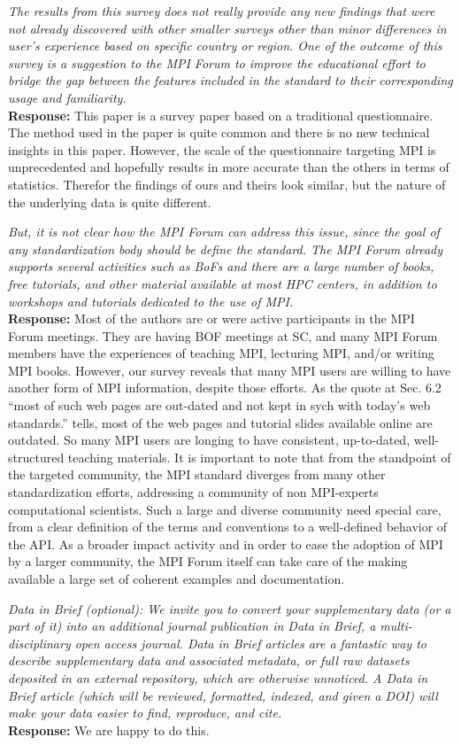 \documentclass[11pt]{article}
\newcommand{\response}[2]{{\vspace{5mm}\noindent{\bf Comment:} \em #1}\\%
  {\bf Response:} #2}
\begin{document}
\response{The results from this survey does not really provide any
  new findings that were not already discovered with other smaller
  surveys other than minor differences in user's experience based on
  specific country or region. One of the outcome of this survey is a
  suggestion to the MPI Forum to improve the educational effort to
  bridge the gap between the features included in the standard to
  their corresponding usage and familiarity.}
         {This paper is a survey paper based on a traditional
           questionnaire.  The method used in the paper is quite
           common and there is no new technical insights in this paper.
           However, the scale of the
           questionnaire targeting MPI is unprecedented and hopefully
           results in more accurate than the others in terms of
           statistics.
           Therefor the findings of ours and theirs look similar, but
           the nature of the underlying data is quite different.
}

\response{But, it is not clear how the MPI Forum can address this
  issue, since the goal of any standardization body should be define
  the standard. The MPI Forum already supports several activities such
  as BoFs and there are a large number of books, free tutorials, and
  other material available at most HPC centers, in addition to
  workshops and tutorials dedicated to the use of MPI.}
{Most of the authors are or were active participants in the MPI Forum
  meetings.  They are having BOF meetings at SC, and many MPI Forum
  members have the experiences of teaching MPI, lecturing MPI, and/or
  writing MPI books. However, our survey reveals that many MPI users
  are willing to have another form of MPI information, despite those
  efforts. As the quote at Sec. 6.2 ``most of such web pages are
  out-dated and not kept in sych with today’s web standards.'' tells,
  most of the web pages and tutorial slides available online are
  outdated. So many MPI users are longing to have consistent,
  up-to-dated, well-structured teaching materials.
  It is important to note that from the standpoint of the targeted community,
  the MPI standard diverges from many other standardization efforts,
  addressing a community of non MPI-experts computational scientists.
  Such a large and diverse community need special care, from a clear
  definition of the terms and conventions to a well-defined behavior of
  the API. As a broader impact activity and in order to ease the adoption
  of MPI by a larger community, the MPI Forum itself can take care of the
  making available a large set of coherent examples and documentation.
}


\response{Data in Brief (optional): We invite you to convert your
  supplementary data (or a part of it) into an additional journal
  publication in Data in Brief, a multi-disciplinary open access
  journal. Data in Brief articles are a fantastic way to describe
  supplementary data and associated metadata, or full raw datasets
  deposited in an external repository, which are otherwise
  unnoticed. A Data in Brief article (which will be reviewed,
  formatted, indexed, and given a DOI) will make your data easier to
  find, reproduce, and cite.}
{We are happy to do this.}
\end{document}

